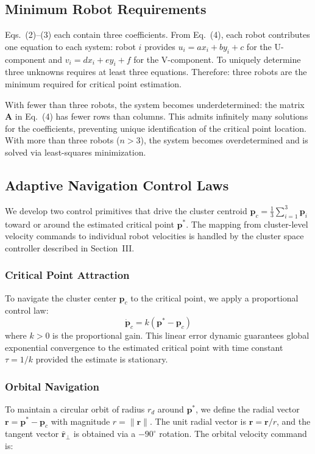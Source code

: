 \documentclass[lettersize,journal]{IEEEtran}
\begin{document}
\subsection{Minimum Robot Requirements}

Eqs.~(2)--(3) each contain three coefficients. From Eq.~(4), each robot contributes one equation to each system: robot $i$ provides $u_i = ax_i + by_i + c$ for the U-component and $v_i = dx_i + ey_i + f$ for the V-component. To uniquely determine three unknowns requires at least three equations. Therefore: three robots are the minimum required for critical point estimation.

With fewer than three robots, the system becomes underdetermined: the matrix $\mathbf{A}$ in Eq.~(4) has fewer rows than columns. This admits infinitely many solutions for the coefficients, preventing unique identification of the critical point location. With more than three robots ($n > 3$), the system becomes overdetermined and is solved via least-squares minimization.


\subsection{Adaptive Navigation Control Laws}
\label{sec:control_primitives}

We develop two control primitives that drive the cluster centroid $\mathbf{p}_c = \frac{1}{3}\sum_{i=1}^{3}\mathbf{p}_i$ toward or around the estimated critical point $\mathbf{p}^*$. The mapping from cluster-level velocity commands to individual robot velocities is handled by the cluster space controller described in Section~III.

\subsubsection{Critical Point Attraction}
To navigate the cluster center $\mathbf{p}_c$ to the critical point, we apply a proportional control law:
\begin{equation}
\dot{\mathbf{p}}_c = k(\mathbf{p}^* - \mathbf{p}_c)
\end{equation}
where $k > 0$ is the proportional gain. This linear error dynamic guarantees global exponential convergence to the estimated critical point with time constant $\tau = 1/k$ provided the estimate is stationary.

\subsubsection{Orbital Navigation}
To maintain a circular orbit of radius $r_d$ around $\mathbf{p}^*$, we define the radial vector $\mathbf{r} = \mathbf{p}^* - \mathbf{p}_c$ with magnitude $r = \|\mathbf{r}\|$. The unit radial vector is $\hat{\mathbf{r}} = \mathbf{r}/r$, and the tangent vector $\hat{\mathbf{r}}_\perp$ is obtained via a $-90^\circ$ rotation. The orbital velocity command is:
\end{document}
